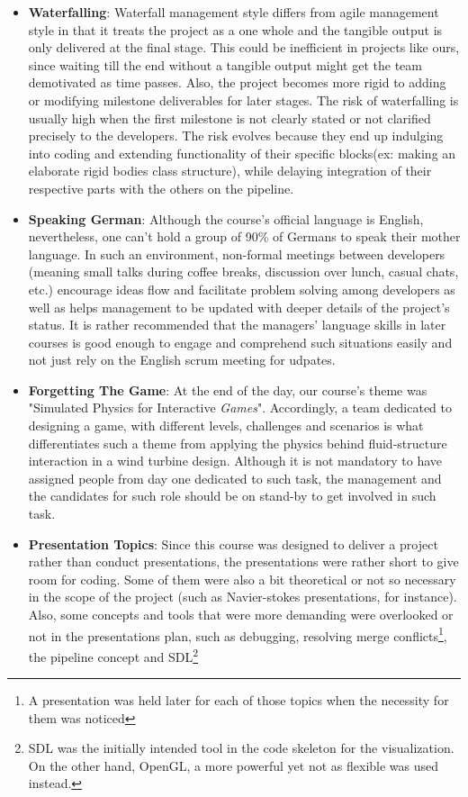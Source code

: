 \begin{itemize}
  \item \textbf{Waterfalling}: Waterfall management style differs from agile management style in that it treats the project as a one whole and the tangible output is only delivered at the final stage. This could be inefficient in projects like ours, since waiting till the end without a tangible output might get the team demotivated as time passes. Also, the project becomes more rigid to adding or modifying milestone deliverables for later stages. The risk of waterfalling is usually high when the first milestone is not clearly stated or not clarified precisely to the developers. The risk evolves because they end up indulging into coding and extending functionality of their specific blocks(ex: making an elaborate rigid bodies class structure), while delaying integration of their respective parts with the others on the pipeline.
  \item \textbf{Speaking German}: Although the course's official language is English, nevertheless, one can't hold a group of 90\% of Germans to speak their mother language. In such an environment, non-formal meetings between developers (meaning small talks during coffee breaks, discussion over lunch, casual chats, etc.) encourage ideas flow and facilitate problem solving among developers as well as helps management to be updated with deeper details of the project's status. It is rather recommended that the managers' language skills in later courses is good enough to engage and comprehend such situations easily and not just rely on the English scrum meeting for udpates.
  \item \textbf{Forgetting The Game}: At the end of the day, our course's theme was "Simulated Physics for Interactive \emph{Games}". Accordingly, a team dedicated to designing a game, with different levels, challenges and scenarios is what differentiates such a theme from applying the physics behind fluid-structure interaction in a wind turbine design. Although it is not mandatory to have assigned people from day one dedicated to such task, the management and the candidates for such role should be on stand-by to get involved in such task.
  \item \textbf{Presentation Topics}: Since this course was designed to deliver a project rather than conduct presentations, the presentations were rather short to give room for coding. Some of them were also a bit theoretical or not so necessary in the scope of the project (such as Navier-stokes presentations, for instance). Also, some concepts and tools that were more demanding were overlooked or not in the presentations plan, such as debugging, resolving merge conflicts\footnote{A presentation was held later for each of those topics when the necessity for them was noticed}, the pipeline concept and SDL\footnote{SDL was the initially intended tool in the code skeleton for the visualization. On the other hand, OpenGL, a more powerful yet not as flexible was used instead.}
\end{itemize}